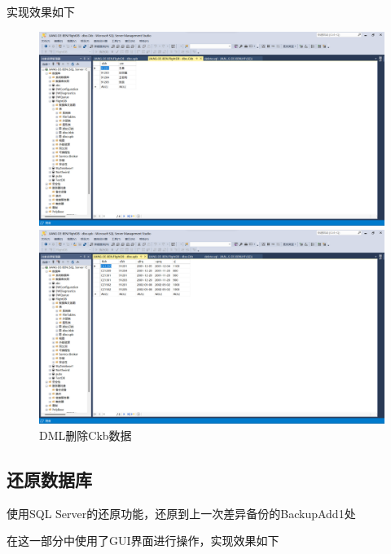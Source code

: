 \documentclass[UTF8,12pt]{article}
\begin{document}
实现效果如下
\begin{figure}[htbp]
    \centering
	\begin{minipage}{0.6\linewidth}
		\centering
		\includegraphics[width=0.9\linewidth]{img/11.png}
	\end{minipage}
	\begin{minipage}{0.6\linewidth}
		\centering
		\includegraphics[width=0.9\linewidth]{img/12.png}
	\end{minipage}
    \caption{DML删除Ckb数据}
\end{figure}

\subsection{还原数据库}
使用SQL Server的还原功能，还原到上一次差异备份的BackupAdd1处

在这一部分中使用了GUI界面进行操作，实现效果如下
\end{document}
